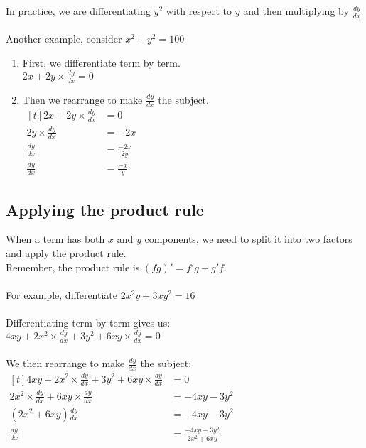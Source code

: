 \documentclass[../main.tex]{subfiles}
\begin{document}
In practice, we are differentiating \(y^2\) with respect to \(y\) and then multiplying by \(\frac{dy}{dx}\)\\ \\
Another example, consider \(x^2+y^2=100\)
\begin{enumerate}
    \item First, we differentiate term by term.\\
    \( 2x + 2y\times\frac{dy}{dx}=0\)
    \item Then we rearrange to make \(\frac{dy}{dx}\) the subject.\\
    $
    \!
    \begin{aligned}[t]
     2x + 2y\times\frac{dy}{dx}
        &= 0 \\
     2y\times\frac{dy}{dx}
        &= -2x \\
    \frac{dy}{dx}
        &= \frac{-2x}{2y} \\
    \frac{dy}{dx}
        &= \frac{-x}{y}
    \end{aligned}
    $
\end{enumerate}

\subsection*{Applying the product rule}
When a term has both \(x\) and \(y\) components, we need to split it into two factors and apply the product rule.\\
Remember, the product rule is \( (fg)' = f'g +g'f\).\\ \\
For example, differentiate \(2x^2y+3xy^2=16\)\\ \\
Differentiating term by term gives us:\\
\(4xy + 2x^2\times\frac{dy}{dx}+3y^2+6xy\times\frac{dy}{dx}=0\)\\ \\
We then rearrange to make \(\frac{dy}{dx}\) the subject:\\
    $
    \!
    \begin{aligned}[t]
     4xy + 2x^2\times\frac{dy}{dx}+3y^2+6xy\times\frac{dy}{dx}
        &= 0 \\
     2x^2\times\frac{dy}{dx}+6xy\times\frac{dy}{dx}
        &= -4xy-3y^2 \\
    (2x^2+6xy)\frac{dy}{dx}
        &= -4xy-3y^2 \\
    \frac{dy}{dx}
        &= \frac{-4xy-3y^2}{2x^2+6xy}
    \end{aligned}
    $
\end{document}
